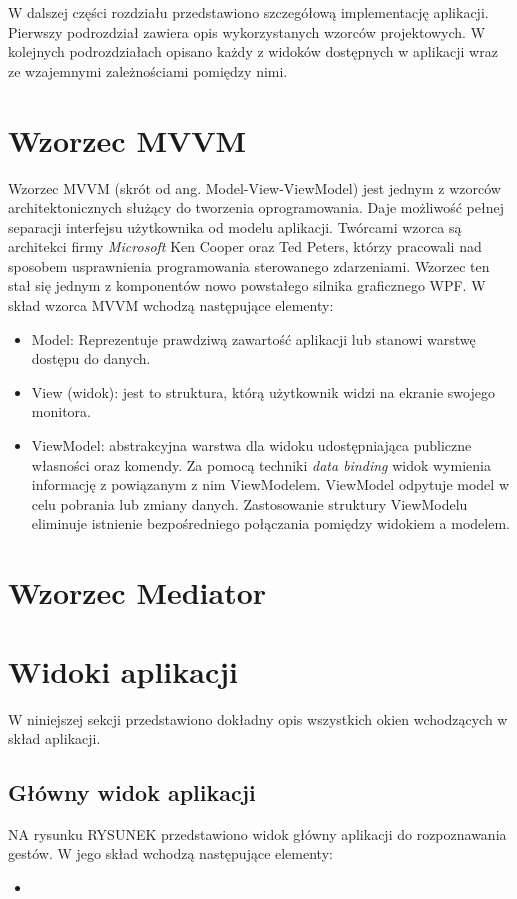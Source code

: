 W dalszej części rozdziału przedstawiono szczegółową implementację aplikacji. Pierwszy podrozdział zawiera opis wykorzystanych wzorców projektowych. W kolejnych podrozdziałach opisano każdy z widoków dostępnych w aplikacji wraz ze wzajemnymi zależnościami pomiędzy nimi.

\section{Wzorzec MVVM}
Wzorzec MVVM (skrót od ang. Model-View-ViewModel) jest jednym z wzorców architektonicznych służący do tworzenia oprogramowania. Daje możliwość pełnej separacji interfejsu użytkownika od modelu aplikacji. Twórcami wzorca są architekci firmy \textit{Microsoft} Ken Cooper oraz Ted Peters, którzy pracowali nad sposobem usprawnienia programowania sterowanego zdarzeniami. Wzorzec ten stał się jednym z komponentów nowo powstałego silnika graficznego WPF. 
W skład wzorca MVVM wchodzą następujące elementy:
\begin{itemize}
	\item Model: Reprezentuje prawdziwą zawartość aplikacji lub stanowi warstwę dostępu do danych.
	\item View (widok): jest to struktura, którą użytkownik widzi na ekranie swojego monitora.
	\item ViewModel: abstrakcyjna warstwa dla widoku udostępniająca publiczne własności oraz komendy. Za pomocą techniki \textit{data binding} widok wymienia informację z powiązanym z nim ViewModelem. ViewModel odpytuje model w celu pobrania lub zmiany danych. Zastosowanie struktury ViewModelu eliminuje istnienie bezpośredniego połączania pomiędzy widokiem a modelem.
\end{itemize}

\section{Wzorzec Mediator}


\section{Widoki aplikacji}
W niniejszej sekcji przedstawiono dokładny opis wszystkich okien wchodzących w skład aplikacji.
\subsection{Główny widok aplikacji}
NA rysunku RYSUNEK przedstawiono widok główny aplikacji do rozpoznawania gestów. W jego skład wchodzą następujące elementy:
\begin{itemize}
	\item 
\end{itemize}